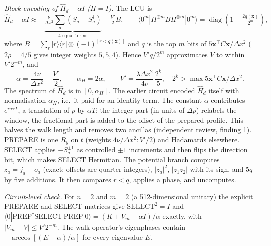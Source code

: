 \documentclass[11pt,a4paper]{article}
\begin{document}
\emph{Block encoding of $\hat H_d-\alpha I$ ($H=I$).} The LCU is
\[
 \hat H_d-\alpha I\approx-\underbrace{\tfrac{\nu}{\Delta x^2}\sum_a(S_a+S_a^\dagger)}_{4\text{ equal terms}}
 -\tfrac{V'}2B,\qquad
 \langle0^m|H^{\otimes m}BH^{\otimes m}|0^m\rangle
 =\operatorname{diag}\!\left(1-\tfrac{2q(\mathbf x)}{2^m}\right),
\]
where $B=\sum_r|r\rangle\langle r|\otimes(-1)^{[r<q(\mathbf x)]}$ and
$q$ is the top $m$ bits of $5\mathbf x^\top C\mathbf x/\Delta x^2$
($2\rho=4/5$ gives integer weights $5,5,4$). Hence $V'q/2^m$ approximates
$V$ to within $V'2^{-m}$, and
\begin{equation}
 \alpha=\frac{4\nu}{\Delta x^2}+\frac{V'}2,\qquad\alpha_H=2\alpha,\qquad
 V'=\frac{\lambda\Delta x^2}{4\nu}\,\frac{2^{k}}5,\quad
 2^k>\max 5\mathbf x^\top C\mathbf x/\Delta x^2.
 \label{eq:alpha}
\end{equation}
The spectrum of $\hat H_d$ is in $[0,\alpha_H]$. The earlier circuit encoded $\hat H_d$ itself with normalisation
$\alpha_H$, i.e.\ it paid for an identity term. The constant $\alpha$ contributes $e^{i\eta\alpha T}$, a translation of
$p$ by $\alpha T$: the integer part (in units of $\Delta p$) relabels the window, the fractional part is added to the
offset of the prepared profile. This halves the walk length and removes two ancillas (independent review, finding 1).
PREPARE is one $R_y$ on $t$ (weights $4\nu/\Delta x^2:V'/2$) and Hadamards
elsewhere. SELECT applies $-S_a^{\pm1}$ as controlled $\pm1$ increments
and then flips the direction bit, which makes SELECT Hermitian.
The potential branch computes $z_a=j_a-o_a$ (exact: offsets are
quarter-integers), $|z_a|^2$, $|z_1z_2|$ with its sign, and $5q$ by five
additions. It then compares $r<q$, applies a phase, and uncomputes.

\emph{Circuit-level check.} For $n=2$ and $m=2$ (a
512-dimensional unitary) the explicit PREPARE and SELECT matrices give
$\mathrm{SELECT}^2=I$ and
$\langle0|\mathrm{PREP}^\dagger\mathrm{SELECT}\,\mathrm{PREP}|0\rangle
=(K+V_m-\alpha I)/\alpha$ exactly, with $|V_m-V|\le V'2^{-m}$. The walk
operator's eigenphases contain $\pm\arccos[(E-\alpha)/\alpha]$ for every
eigenvalue $E$.
\end{document}

